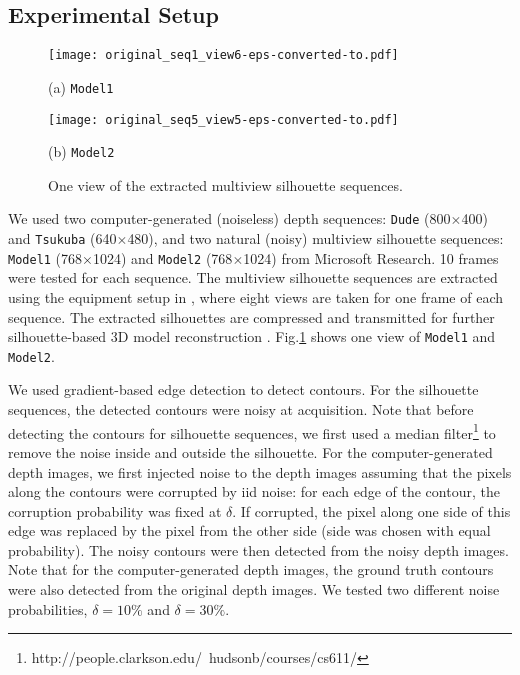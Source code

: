 \subsection{Experimental Setup}
\label{subsec:experimentalSetup}


\begin{figure}[t]

\begin{minipage}[b]{.48\linewidth}
  \centering
  \centerline{\texttt{[image: original\_seq1\_view6-eps-converted-to.pdf]}}
  \centerline{(a) \texttt{Model1}}\medskip
\end{minipage}
\hfill
\begin{minipage}[b]{0.48\linewidth}
  \centering
  \centerline{\texttt{[image: original\_seq5\_view5-eps-converted-to.pdf]}}
  \centerline{(b) \texttt{Model2}}\medskip
\end{minipage}

\vspace{-0.2cm}
\caption{One view of the extracted multiview silhouette sequences.}
\label{fig:silhouette}
\end{figure}


We used two computer-generated (noiseless) depth sequences: \texttt{Dude} (800$\times$400) and \texttt{Tsukuba} (640$\times$480), and two natural (noisy) multiview silhouette sequences: \texttt{Model1} (768$\times$1024) and \texttt{Model2} (768$\times$1024) from Microsoft Research.
10 frames were tested for each sequence.
The multiview silhouette sequences are extracted using the equipment setup in \cite{loop2013real}, where eight views are taken for one frame of each sequence.
The extracted silhouettes are compressed and transmitted for further silhouette-based 3D model reconstruction \cite{mulayim2003silhouette,loop2013real}.
Fig.\;\ref{fig:silhouette} shows one view of \texttt{Model1} and \texttt{Model2}.

We used gradient-based edge detection \cite{daribo14} to detect contours.
For the silhouette sequences, the detected contours were noisy at acquisition.
Note that before detecting the contours for silhouette sequences, we first used a median filter\footnote{http://people.clarkson.edu/~hudsonb/courses/cs611/} to remove the noise inside and outside the silhouette.
For the computer-generated depth images, we first injected noise to the depth images assuming that the pixels along the contours were corrupted by iid noise: for each edge of the contour, the corruption probability was fixed at $\delta$.
If corrupted, the pixel along one side of this edge was replaced by the pixel from the other side (side was chosen with equal probability).
The noisy contours were then detected from the noisy depth images.
Note that for the computer-generated depth images, the ground truth contours were also detected from the original depth images.
We tested two different noise probabilities, $\delta=10\%$ and $\delta=30\%$.

